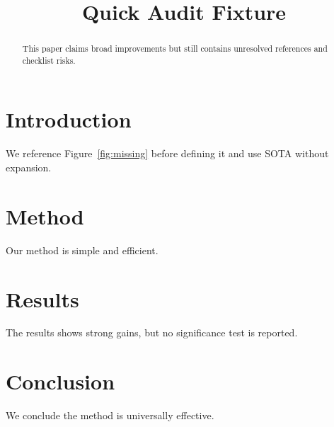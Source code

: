 \documentclass{article}
\title{Quick Audit Fixture}
\begin{document}
\begin{abstract}
This paper claims broad improvements but still contains unresolved references and checklist risks.
\end{abstract}
\section{Introduction}
We reference Figure~\ref{fig:missing} before defining it and use SOTA without expansion.
\section{Method}
Our method is simple and efficient.
\section{Results}
The results shows strong gains, but no significance test is reported.
\section{Conclusion}
We conclude the method is universally effective.
\end{document}

